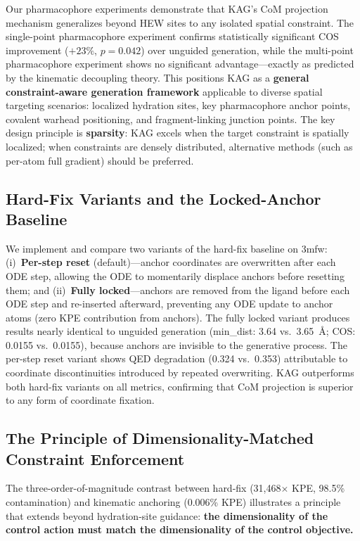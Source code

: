 \documentclass{article}
\begin{document}
Our pharmacophore experiments demonstrate that KAG's CoM projection
mechanism generalizes beyond HEW sites to any isolated spatial constraint.
The single-point pharmacophore experiment confirms statistically
significant COS improvement ($+23\%$, $p=0.042$) over unguided
generation, while the multi-point pharmacophore experiment shows no
significant advantage---exactly as predicted by the kinematic decoupling
theory.  This positions KAG as a \textbf{general constraint-aware
generation framework} applicable to diverse spatial targeting scenarios:
localized hydration sites, key pharmacophore anchor points, covalent
warhead positioning, and fragment-linking junction points.
The key design principle is \textbf{sparsity}: KAG excels when the
target constraint is spatially localized; when constraints are densely
distributed, alternative methods (such as per-atom full gradient)
should be preferred.

\subsection{Hard-Fix Variants and the Locked-Anchor Baseline}
\label{sec:hardfix_variants}

We implement and compare two variants of the hard-fix baseline on 3mfw:
(i)~\textbf{Per-step reset} (default)---anchor coordinates are overwritten
after each ODE step, allowing the ODE to momentarily displace anchors
before resetting them; and (ii)~\textbf{Fully locked}---anchors are
removed from the ligand before each ODE step and re-inserted afterward,
preventing any ODE update to anchor atoms (zero KPE contribution from
anchors).  The fully locked variant produces results nearly identical
to unguided generation (min\_dist: 3.64 vs.\ 3.65~\AA{}; COS: 0.0155
vs.\ 0.0155), because anchors are invisible to the generative process.
The per-step reset variant shows QED degradation (0.324 vs.\ 0.353)
attributable to coordinate discontinuities introduced by repeated
overwriting.  KAG outperforms both hard-fix variants on all metrics,
confirming that CoM projection is superior to any form of coordinate
fixation.

\subsection{The Principle of Dimensionality-Matched Constraint Enforcement}

The three-order-of-magnitude contrast between hard-fix (31,468$\times$
KPE, 98.5\% contamination) and kinematic anchoring (0.006\% KPE)
illustrates a principle that extends beyond hydration-site guidance:
\textbf{the dimensionality of the control action must match the
dimensionality of the control objective.}
\end{document}
